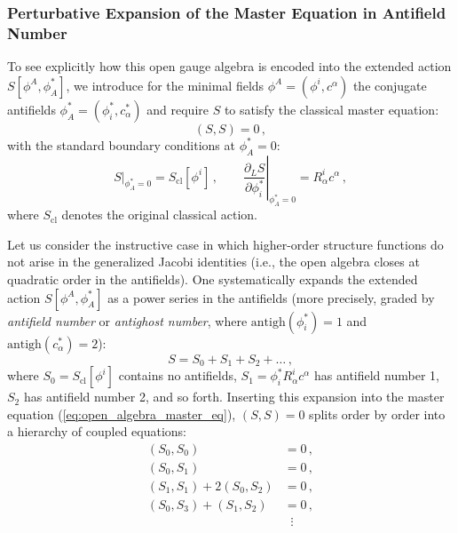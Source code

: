\subsubsection{Perturbative Expansion of the Master Equation in Antifield Number}

To see explicitly how this open gauge algebra is encoded into the extended action \(S[\phi^A, \phi_A^*]\), we introduce for the minimal fields \(\phi^A = (\phi^i, c^\alpha)\) the conjugate antifields \(\phi_A^* = (\phi_i^*, c_\alpha^*)\) and require \(S\) to satisfy the classical master equation:
\begin{equation} \label{eq:open_algebra_master_eq}
    (S, S) = 0 \, ,
\end{equation}
with the standard boundary conditions at \(\phi_A^* = 0\):
\begin{equation} \label{eq:open_algebra_boundary}
    \left. S \right|_{\phi_A^* = 0} = S_{\text{cl}}[\phi^i] \, , \qquad \left. \frac{\partial_L S}{\partial \phi_i^*} \right|_{\phi_A^* = 0} = R^i_\alpha c^\alpha \, ,
\end{equation}
where \(S_{\text{cl}}\) denotes the original classical action.

Let us consider the instructive case in which higher-order structure functions do not arise in the generalized Jacobi identities (i.e., the open algebra closes at quadratic order in the antifields). One systematically expands the extended action \(S[\phi^A, \phi_A^*]\) as a power series in the antifields (more precisely, graded by \textit{antifield number} or \textit{antighost number}, where \(\text{antigh}(\phi_i^*) = 1\) and \(\text{antigh}(c_\alpha^*) = 2\)):
\begin{equation} \label{eq:action_antifield_expansion}
    S = S_0 + S_1 + S_2 + \dots \, ,
\end{equation}
where \(S_0 = S_{\text{cl}}[\phi^i]\) contains no antifields, \(S_1 = \phi_i^* R^i_\alpha c^\alpha\) has antifield number 1, \(S_2\) has antifield number 2, and so forth. Inserting this expansion into the master equation (\ref{eq:open_algebra_master_eq}), \((S, S) = 0\) splits order by order into a hierarchy of coupled equations:
\begin{align}
    (S_0, S_0)               & = 0 \, , \label{eq:master_order_0} \\
    (S_0, S_1)               & = 0 \, , \label{eq:master_order_1} \\
    (S_1, S_1) + 2(S_0, S_2) & = 0 \, , \label{eq:master_order_2} \\
    (S_0, S_3) + (S_1, S_2)  & = 0 \, , \label{eq:master_order_3} \\
                             & \;\;\vdots \nonumber
\end{align}

